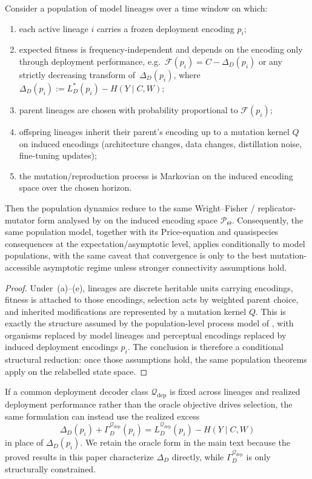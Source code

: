 \documentclass[twoside,11pt]{article}
\begin{document}
\begin{proposition}\label{prop:llm-wf}
Consider a population of model lineages over a time window on which:
\begin{enumerate}[label=(\alph*)]
\item each active lineage $i$ carries a frozen deployment encoding $p_i$;
\item expected fitness is frequency-independent and depends on the encoding only through deployment performance, e.g.\
$\mathcal{F}(p_i) = C - \Delta_D(p_i)$ or any strictly decreasing transform of~$\Delta_D(p_i)$, where $\Delta_D(p_i):=L_D^*(p_i)-H(Y \mid C,W)$;
\item parent lineages are chosen with probability proportional to $\mathcal{F}(p_i)$;
\item offspring lineages inherit their parent's encoding up to a mutation kernel $Q$ on induced encodings (architecture changes, data changes, distillation noise, fine-tuning updates);
\item the mutation/reproduction process is Markovian on the induced encoding space over the chosen horizon.
\end{enumerate}
Then the population dynamics reduce to the same Wright--Fisher / replicator-mutator form analysed by \citet{dallariva_2026} on the induced encoding space $\mathcal{P}_\Theta$. Consequently, the same population model, together with its Price-equation and quasispecies consequences at the expectation/asymptotic level, applies conditionally to model populations, with the same caveat that convergence is only to the best mutation-accessible asymptotic regime unless stronger connectivity assumptions hold.
\end{proposition}

\begin{proof}
Under~(a)--(e), lineages are discrete heritable units carrying encodings, fitness is attached to those encodings, selection acts by weighted parent choice, and inherited modifications are represented by a mutation kernel $Q$. This is exactly the structure assumed by the population-level process model of \citet{dallariva_2026}, with organisms replaced by model lineages and perceptual encodings replaced by induced deployment encodings $p_i$. The conclusion is therefore a conditional structural reduction: once those assumptions hold, the same population theorems apply on the relabelled state space.
\end{proof}

If a common deployment decoder class $\mathcal{Q}_{\mathrm{dep}}$ is fixed across lineages and realized deployment performance rather than the oracle objective drives selection, the same formulation can instead use the realized excess
\[
\Delta_D(p_i) + \Gamma_D^{\mathcal{Q}_{\mathrm{dep}}}(p_i)
= L_D^{\mathcal{Q}_{\mathrm{dep}}}(p_i) - H(Y \mid C,W)
\]
in place of $\Delta_D(p_i)$. We retain the oracle form in the main text because the proved results in this paper characterize $\Delta_D$ directly, while $\Gamma_D^{\mathcal{Q}_{\mathrm{dep}}}$ is only structurally constrained.
\end{document}
